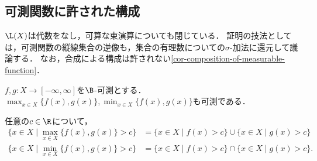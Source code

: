 \documentclass[uplatex, dvipdfmx]{jsreport}
\begin{document}
\subsection{可測関数に許された構成}

\begin{tcolorbox}[colframe=ForestGreen, colback=ForestGreen!10!white,breakable,colbacktitle=ForestGreen!40!white,coltitle=black,fonttitle=\bfseries\sffamily,
title=]
    $\L(X)$は代数をなし，可算な束演算についても閉じている．
    証明の技法としては，可測関数の縦線集合の逆像も，集合の有理数についての$\sigma$-加法に還元して議論する．
    なお，合成による構成は許されない\ref{cor-composition-of-measurable-function}．
\end{tcolorbox}

\begin{proposition}[$\L(X)$は関数束をなす]
    $f,g:X\to[-\infty,\infty]$を$\B$-可測とする．$\max_{x\in X}\{f(x),g(x)\},\min_{x\in X}\{f(x),g(x)\}$も可測である．
\end{proposition}
\begin{Proof}
    任意の$c\in\R$について，
    \begin{align*}
        \{x\in X\mid\max_{x\in X}\{f(x),g(x)\}>c\}&=\{x\in X\mid f(x)>c\}\cup\{x\in X\mid g(x)>c\}\\
        \{x\in X\mid\min_{x\in X}\{f(x),g(x)\}>c\}&=\{x\in X\mid f(x)>c\}\cap\{x\in X\mid g(x)>c\}.
    \end{align*}
\end{Proof}
\end{document}
